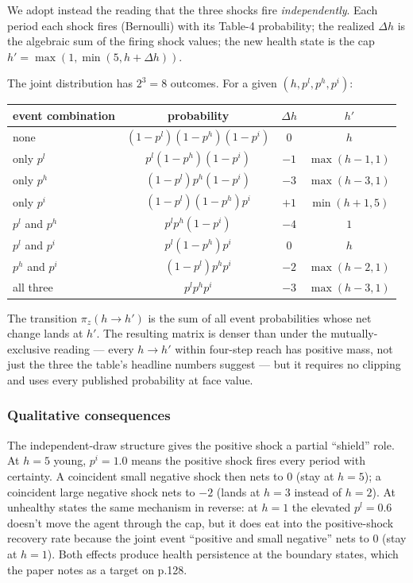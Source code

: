 We adopt instead the reading that the three shocks fire \emph{independently}. Each period each shock fires (Bernoulli) with its Table-4 probability; the realized $\Delta h$ is the algebraic sum of the firing shock values; the new health state is the cap $h' = \max(1, \min(5, h + \Delta h))$.

The joint distribution has $2^3 = 8$ outcomes. For a given $(h, p^l, p^h, p^i)$:
\begin{center}
\begin{tabular}{lccc}
event combination & probability & $\Delta h$ & $h'$ \\
\hline
none                 & $(1-p^l)(1-p^h)(1-p^i)$           & $0$  & $h$ \\
only $p^l$           & $p^l(1-p^h)(1-p^i)$               & $-1$ & $\max(h-1, 1)$ \\
only $p^h$           & $(1-p^l)p^h(1-p^i)$               & $-3$ & $\max(h-3, 1)$ \\
only $p^i$           & $(1-p^l)(1-p^h)p^i$               & $+1$ & $\min(h+1, 5)$ \\
$p^l$ and $p^h$      & $p^l p^h (1-p^i)$                 & $-4$ & $1$ \\
$p^l$ and $p^i$      & $p^l (1-p^h) p^i$                 & $0$  & $h$ \\
$p^h$ and $p^i$      & $(1-p^l) p^h p^i$                 & $-2$ & $\max(h-2, 1)$ \\
all three            & $p^l p^h p^i$                     & $-3$ & $\max(h-3, 1)$
\end{tabular}
\end{center}
The transition $\pi_z(h \to h')$ is the sum of all event probabilities whose net change lands at $h'$. The resulting matrix is denser than under the mutually-exclusive reading --- every $h \to h'$ within four-step reach has positive mass, not just the three the table's headline numbers suggest --- but it requires no clipping and uses every published probability at face value.

\subsubsection{Qualitative consequences}

The independent-draw structure gives the positive shock a partial ``shield'' role. At $h=5$ young, $p^i = 1.0$ means the positive shock fires every period with certainty. A coincident small negative shock then nets to $0$ (stay at $h=5$); a coincident large negative shock nets to $-2$ (lands at $h=3$ instead of $h=2$). At unhealthy states the same mechanism in reverse: at $h=1$ the elevated $p^l = 0.6$ doesn't move the agent through the cap, but it does eat into the positive-shock recovery rate because the joint event ``positive and small negative'' nets to $0$ (stay at $h=1$). Both effects produce health persistence at the boundary states, which the paper notes as a target on p.128.

